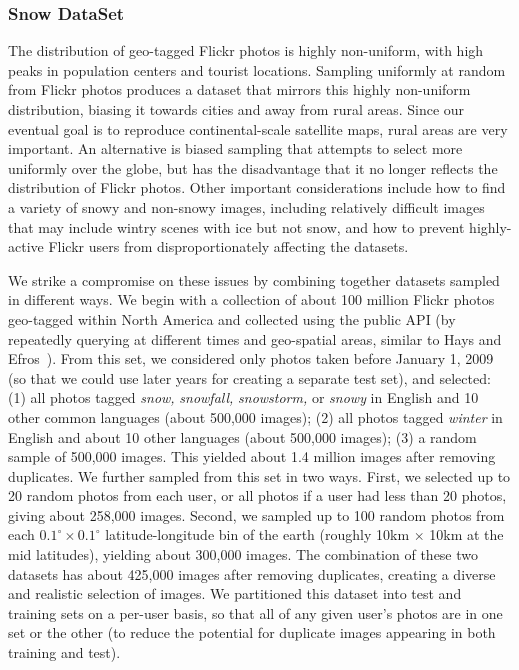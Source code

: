 \subsubsection{Snow DataSet}

The distribution of geo-tagged Flickr photos is highly
non-uniform, with high peaks in population centers and tourist
locations.  Sampling uniformly at random from  Flickr photos
produces a dataset that mirrors this highly non-uniform distribution,
biasing it towards cities and away from rural areas. Since our
eventual goal is to reproduce continental-scale satellite maps, rural
areas are very important. An alternative is biased sampling that
attempts to select more uniformly over the globe, but has the
disadvantage that it no longer reflects the distribution of Flickr
photos. Other important considerations include how to find a variety
of snowy and non-snowy images, including relatively difficult images
that may include wintry scenes with ice but not snow, and how to
prevent highly-active Flickr users from disproportionately affecting
the datasets.

We strike a compromise on these issues by combining together datasets
sampled in different ways.  We begin with a collection of about 100
million Flickr photos geo-tagged within North America and collected
using the public API (by repeatedly querying at different times and
geo-spatial areas, similar to Hays and Efros~\cite{hays}). From this set, we
considered only photos taken before January 1, 2009 (so that we could
use later years for creating a separate test set), and selected:
%
(1) all photos tagged \textit{snow,} \textit{snowfall,} \textit{snowstorm,} or \textit{snowy} in
  English and 10 other common languages (about 500,000 images);
(2) all photos tagged \textit{winter} in English and about 10 other languages (about 500,000 images);
(3) a random sample of 500,000 images.
%
This yielded about 1.4 million images after removing duplicates.  We
further sampled from this set in two ways. First, we selected up to 20
random photos from each user, or all photos if a user had less than 20
photos, giving about 258,000 images. Second, we sampled up to 100
random photos from each $0.1^\circ \times 0.1^\circ$
latitude-longitude bin of the earth (roughly 10km $\times$ 10km at the
mid latitudes), yielding about 300,000 images. The combination of
these two datasets has about 425,000 images after removing duplicates,
creating 
a diverse and realistic selection
of images.  We partitioned this dataset into test and training
sets on a per-user basis, so that all of any given user's photos are
in one set or the other  (to reduce the potential
for duplicate images appearing in both
training and test).

